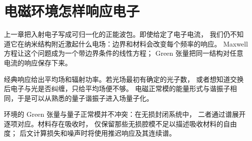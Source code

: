 \chapter{电磁环境怎样响应电子}
\label{chap:feqo-electromagnetic-field}

上一章把入射电子写成可归一化的正能波包。即使给定了电子电流，
我们仍不知道它在纳米结构附近激起什么电场：边界和材料会改变每个频率的响应。
Maxwell 方程让这个问题成为一个带边界条件的线性方程；
Green 张量把同一结构对任意电流的响应保存下来。



经典响应给出平均场和辐射功率。若光场最初有确定的光子数，
或者想知道交换后电子与光是否纠缠，只给平均场便不够。
电磁正常模的能量形式与谐振子相同，于是可以从熟悉的量子谐振子进入场量子化。



环境的 Green 张量与量子正常模并不冲突：在无损封闭系统中，
二者通过谱展开逐项对应。材料存在吸收时，
仅保留那些无损腔模不足以描述吸收材料的自由度；
后文计算损失和噪声时将使用推迟响应及其连续谱。
